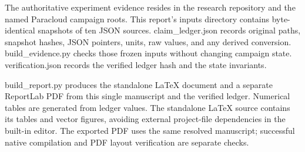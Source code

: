 \documentclass[11pt,a4paper]{article}
\begin{document}

The authoritative experiment evidence resides in the research repository and the named Paracloud campaign roots. This report's inputs directory contains byte-identical snapshots of ten JSON sources. claim\_ledger.json records original paths, snapshot hashes, JSON pointers, units, raw values, and any derived conversion. build\_evidence.py checks those frozen inputs without changing campaign state. verification.json records the verified ledger hash and the state invariants.


build\_report.py produces the standalone LaTeX document and a separate ReportLab PDF from this single manuscript and the verified ledger. Numerical tables are generated from ledger values. The standalone LaTeX source contains its tables and vector figures, avoiding external project-file dependencies in the built-in editor. The exported PDF uses the same resolved manuscript; successful native compilation and PDF layout verification are separate checks.
\end{document}
